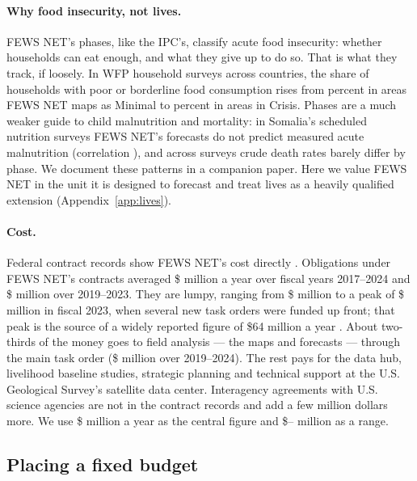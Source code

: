 \documentclass[11pt]{article}
\begin{document}
\paragraph{Why food insecurity, not lives.} FEWS NET's phases, like the IPC's, classify acute food insecurity: whether households can eat enough, and what they give up to do so. That is what they track, if loosely. In WFP household surveys across \fsFoodCountries{} countries, the share of households with poor or borderline food consumption rises from \fsFcsOne{} percent in areas FEWS NET maps as Minimal to \fsFcsThree{} percent in areas in Crisis. Phases are a much weaker guide to child malnutrition and mortality: in Somalia's scheduled nutrition surveys FEWS NET's forecasts do not predict measured acute malnutrition (correlation \fsCorrFc{}), and across surveys crude death rates barely differ by phase. We document these patterns in a companion paper. Here we value FEWS NET in the unit it is designed to forecast and treat lives as a heavily qualified extension (Appendix~\ref{app:lives}).

\paragraph{Cost.} Federal contract records show FEWS NET's cost directly \citep{usaspending}. Obligations under FEWS NET's contracts averaged \$\obAvgLong{} million a year over fiscal years 2017--2024 and \$\obAvgCore{} million over 2019--2023. They are lumpy, ranging from \$\obMin{} million to a peak of \$\obPeak{} million in fiscal 2023, when several new task orders were funded up front; that peak is the source of a widely reported figure of \$64 million a year \citep{NPR2025FEWS}. About two-thirds of the money goes to field analysis --- the maps and forecasts --- through the main task order (\$\obPillarOne{} million over 2019--2024). The rest pays for the data hub, livelihood baseline studies, strategic planning and technical support at the U.S. Geological Survey's satellite data center. Interagency agreements with U.S. science agencies are not in the contract records and add a few million dollars more. We use \$\bcBudget{} million a year as the central figure and \$\bcBudgetLow{}--\bcBudgetHigh{} million as a range.


\subsection{Placing a fixed budget}
\end{document}
